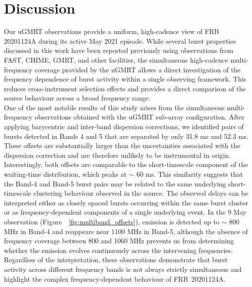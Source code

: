 \documentclass[preprint2, trackchanges]{aastex631}
\begin{document}

\section{Discussion}
Our uGMRT observations provide a uniform, high-cadence view of FRB 20201124A during its active May 2021 episode. While several burst properties discussed in this work have been reported previously using observations from FAST, CHIME, GMRT, and other facilities, the simultaneous high-cadence multi-frequency coverage provided by the uGMRT allows a direct investigation of the frequency dependence of burst activity within a single observing framework. This reduces cross-instrument selection effects and provides a direct comparison of the source behaviour across a broad frequency range.
\\
One of the most notable results of this study arises from the simultaneous multi-frequency observations obtained with the uGMRT sub-array configuration. After applying barycentric and inter-band dispersion corrections, we identified pairs of bursts detected in Bands 4 and 5 that are separated by only 31.8 ms and 52.3 ms. These offsets are substantially larger than the uncertainties associated with the dispersion correction and are therefore unlikely to be instrumental in origin. Interestingly, both offsets are comparable to the short-timescale component of the waiting-time distribution, which peaks at $\sim$ 60 ms. This similarity suggests that the Band-4 and Band-5 burst pairs may be related to the same underlying short-timescale clustering behaviour observed in the source. The observed delays can be interpreted either as closely spaced bursts occurring within the same burst cluster or as frequency-dependent components of a single underlying event. In the 9 May observation (Figure~~\ref{fig:multiband_offsets}), emission is detected up to $\sim$ 800 MHz in Band-4 and reappears near 1100 MHz in Band-5, although the absence of frequency coverage between 800 and 1060 MHz prevents us from determining whether the emission evolves continuously across the intervening frequencies. Regardless of the interpretation, these observations demonstrate that burst activity across different frequency bands is not always strictly simultaneous and highlight the complex frequency-dependent behaviour of FRB~20201124A.
\end{document}
